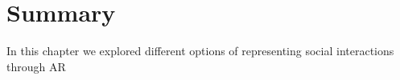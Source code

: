 \section{Summary}

In this chapter we explored different options of representing social interactions through AR

